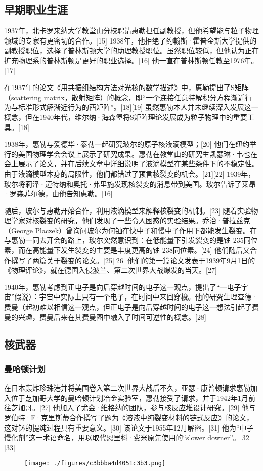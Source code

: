 \subsection{早期职业生涯}
1937年，北卡罗来纳大学教堂山分校聘请惠勒担任副教授，但他希望能与粒子物理领域的专家有更密切的合作。[15] 1938年，他拒绝了约翰斯·霍普金斯大学提供的副教授职位，选择了普林斯顿大学的助理教授职位。虽然职位较低，但他认为正在扩充物理系的普林斯顿是更好的职业选择。[16] 他一直在普林斯顿任教至1976年。[17]

在1937年的论文《用共振组结构方法对光核的数学描述》中，惠勒提出了S矩阵（scattering matrix，散射矩阵）的概念，即“一个连接任意特解积分方程渐近行为与标准形式解渐近行为的酉矩阵”。[18][19] 虽然惠勒本人并未继续深入发展这一概念，但在1940年代，维尔纳·海森堡将S矩阵理论发展成为粒子物理中的重要工具。[18]

1938年，惠勒与爱德华·泰勒一起研究玻尔的原子核液滴模型；[20] 他们在纽约举行的美国物理学会会议上展示了研究成果。惠勒在教堂山的研究生凯瑟琳·韦也在会上展示了论文，并在后续文章中详细说明了液滴模型在某些条件下的不稳定性。由于液滴模型本身的局限性，他们都错过了预言核裂变的机会。[21][22] 1939年，玻尔将莉泽·迈特纳和奥托·弗里施发现核裂变的消息带到美国。玻尔告诉了莱昂·罗森菲尔德，由他告知惠勒。[16]

随后，玻尔与惠勒开始合作，利用液滴模型来解释核裂变的机制。[23] 随着实验物理学家对核裂变的研究，他们发现了一些令人困惑的实验结果。乔治·普拉兹克（George Placzek）曾询问玻尔为何铀在快中子和慢中子作用下都能发生裂变。在与惠勒一同去开会的路上，玻尔突然意识到：在低能量下引发裂变的是铀-235同位素，而在高能量下发生裂变的主要是丰度更高的铀-238同位素。[24] 他们随后又合作撰写了两篇关于裂变的论文。[25][26] 他们的第一篇论文发表于1939年9月1日的《物理评论》，就在德国入侵波兰、第二次世界大战爆发的当天。[27]

1940年，惠勒考虑到正电子是向后穿越时间的电子这一观点，提出了“一电子宇宙”假说）：宇宙中实际上只有一个电子，在时间中来回穿梭。他的研究生理查德·费曼（起初难以相信这一观点，但正电子是向后穿越时间的电子这一想法引起了费曼的兴趣，费曼后来在其费曼图中融入了时间可逆性的概念。[28]
\subsection{核武器}
\subsubsection{曼哈顿计划}
在日本轰炸珍珠港并将美国卷入第二次世界大战后不久，亚瑟·康普顿请求惠勒加入位于芝加哥大学的曼哈顿计划冶金实验室，惠勒接受了请求，并于1942年1月前往芝加哥。[27] 他加入了尤金·维格纳的团队，参与核反应堆设计研究。[29] 他与罗伯特·F·克里斯蒂合作撰写了题为《溶液中纯裂变材料的链式反应》的论文，这对钚的提纯过程具有重要意义。[30] 该论文于1955年12月解密。[31] 他为“中子慢化剂”这一术语命名，用以取代恩里科·费米原先使用的“slower downer”。[32][33]
\begin{figure}[ht]
\centering
\texttt{[image: ./figures/c3bbba4d4051c3b3.png]}
\caption{} \label{fig_YHhl_1}
\end{figure}